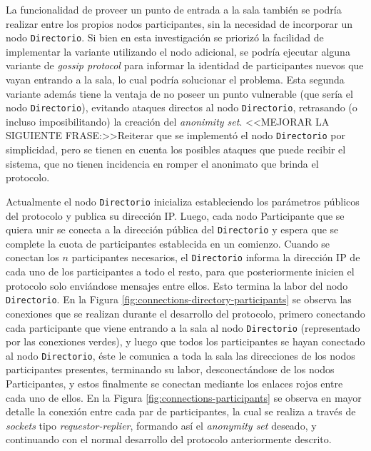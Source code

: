 {La funcionalidad de proveer un punto de entrada a la sala también se podría 
realizar entre los propios nodos participantes, sin la necesidad de incorporar 
un nodo \texttt{Directorio}. Si bien en esta investigación se priorizó la 
facilidad de implementar la variante utilizando el nodo adicional, se podría 
ejecutar alguna variante de \emph{gossip protocol} 
\cite{Demers:1987:EAR:41840.41841} para informar la identidad de participantes 
nuevos que vayan entrando a la sala, lo cual podría solucionar el problema. 
Esta segunda variante además tiene la ventaja de no poseer un punto vulnerable 
(que sería el nodo \texttt{Directorio}), evitando ataques directos al nodo 
\texttt{Directorio}, retrasando (o incluso imposibilitando) la 
creación del \emph{anonimity set}. 
<<MEJORAR LA SIGUIENTE FRASE:>>Reiterar que se implementó el nodo 
\texttt{Directorio} por simplicidad, pero se tienen en cuenta los posibles 
ataques que puede recibir el sistema, que no tienen incidencia en romper el 
anonimato que brinda el protocolo.

Actualmente el nodo \texttt{Directorio} inicializa estableciendo los 
parámetros públicos del protocolo y publica su dirección IP. Luego, cada nodo 
Participante que se quiera unir se conecta a la dirección pública del 
\texttt{Directorio} y espera que se complete la cuota de participantes 
establecida en un comienzo. Cuando se conectan los $n$ participantes 
necesarios, el \texttt{Directorio} informa la dirección IP de cada uno de los 
participantes a todo el resto, para que posteriormente inicien el protocolo 
solo enviándose mensajes entre ellos. Esto termina la labor del nodo 
\texttt{Directorio}. En la Figura \ref{fig:connections-directory-participants} 
se observa las conexiones que se realizan durante el desarrollo del protocolo, 
primero conectando cada participante que viene entrando a la sala al nodo 
\texttt{Directorio} (representado por las conexiones verdes), y luego que 
todos los participantes se hayan conectado al nodo \texttt{Directorio}, éste 
le comunica a toda la sala las direcciones de los nodos participantes 
presentes, terminando su labor, desconectándose de los nodos Participantes, y 
estos finalmente se conectan mediante los enlaces rojos entre cada uno de 
ellos. En la Figura \ref{fig:connections-participants} se observa en mayor 
detalle la conexión entre cada par de participantes, la cual se realiza a 
través de \emph{sockets} tipo \emph{requestor-replier}, formando así el 
\emph{anonymity set} deseado, y continuando con el normal desarrollo 
del protocolo anteriormente descrito.

}
